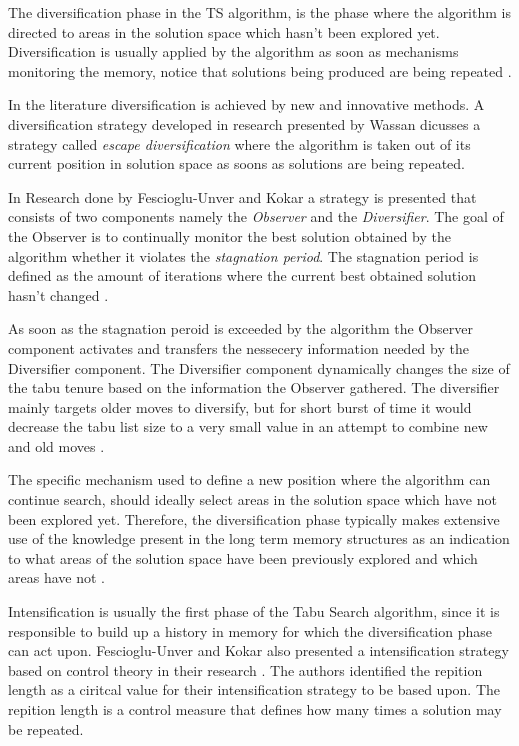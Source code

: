 The diversification phase in the TS algorithm, is the phase where the algorithm is directed to areas in the solution space which hasn't been explored yet. Diversification is usually applied by the algorithm as soon as mechanisms monitoring the memory, notice that solutions being produced are being repeated \cite{ReactiveTabuVHR,SelfControllingReactiveTabu}. 

In the literature diversification is achieved by new and innovative methods. A diversification strategy developed in research presented by Wassan \cite{ReactiveTabuVHR} dicusses a strategy called \emph{escape diversification} where the algorithm is taken out of its current position in solution space as soons as solutions are being repeated. 

In Research done by Fescioglu-Unver and Kokar \cite{SelfControllingReactiveTabu} a strategy is presented that consists of two components namely the \emph{Observer} and the \emph{Diversifier}. The goal of the Observer is to continually monitor the best solution obtained by the algorithm whether it violates the \emph{stagnation period}. The stagnation period is defined as the amount of iterations where the current best obtained solution hasn't changed \cite{SelfControllingReactiveTabu}. 

As soon as the stagnation peroid is exceeded by the algorithm the Observer component activates and transfers the nessecery information needed by the Diversifier component. The Diversifier component dynamically changes the size of the tabu tenure based on the information the Observer gathered. The diversifier mainly targets older moves to diversify, but for short burst of time it would decrease the tabu list size to a very small value in an attempt to combine new and old moves \cite{SelfControllingReactiveTabu}.

The specific mechanism used to define a new position where the algorithm can continue search, should ideally select areas in the solution space which have not been explored yet. Therefore, the diversification phase typically makes extensive use of the knowledge present in the long term memory structures as an indication to what areas of the solution space have been previously explored and which areas have not \cite{TabuParameterization,TabuCrewSchedulingProblem,NonlinearGlobalTabu,SelfControllingReactiveTabu}.

Intensification is usually the first phase of the Tabu Search algorithm, since it is responsible to build up a history in memory for which the diversification phase can act upon. Fescioglu-Unver and Kokar also presented a intensification strategy based on control theory in their research \cite{SelfControllingReactiveTabu}. The authors identified the repition length as a ciritcal value for their intensification strategy to be based upon. The repition length is a control measure that defines how many times a solution may be repeated.

